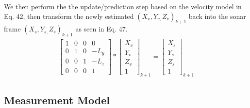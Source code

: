 \documentclass[a4paper]{IEEEtran}
\begin{document}
We then perform the the update/prediction step based on the velocity model in Eq. 42, then transform the newly estimated $(X_{v},Y_{v,}Z_{v})_{k+1}$ back into the sonar frame $(X_{s},Y_{s,}Z_{s})_{k+1}$ as seen in Eq. 47.
\begingroup\makeatletter\def\f@size{7}\check@mathfonts
\begin{gather}
\left[\begin{array}{cccc}
1 & 0 & 0 & 0\\
0 & 1 & 0 & -L_{y}\\
0 & 0 & 1 & -L_{z}\\
0 & 0 & 0 & 1
\end{array}\right]*\left[\begin{array}{c}
X_{v}\\
Y_{v}\\
Z_{v}\\
1
\end{array}\right]_{k+1}=\left[\begin{array}{c}
X_{s}\\
Y_{s}\\
Z_{s}\\
1
\end{array}\right]_{k+1}
\end{gather}
\endgroup 

\subsection{Measurement Model}
\end{document}
